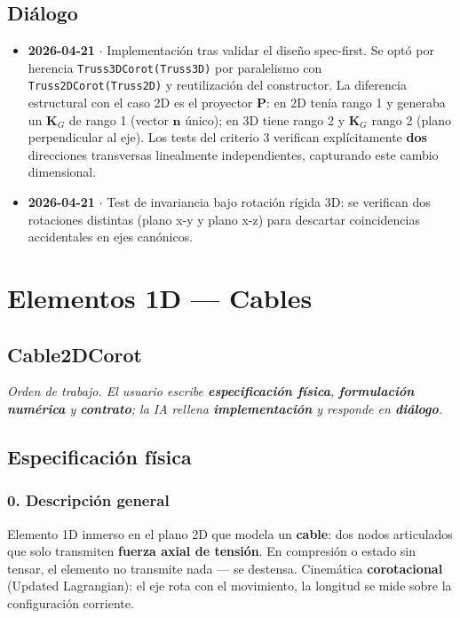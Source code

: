 \documentclass[11pt,letterpaper,oneside]{report}
\begin{document}
\section{Diálogo}

\begin{itemize}
  \item \textbf{2026-04-21} \ensuremath{\cdot} Implementación tras validar el diseño spec-first. Se optó por herencia \texttt{Truss3DCorot(Truss3D)} por paralelismo con \texttt{Truss2DCorot(Truss2D)} y reutilización del constructor. La diferencia estructural con el caso 2D es el proyector $\mathbf P$: en 2D tenía rango 1 y generaba un $\mathbf K_G$ de rango 1 (vector $\mathbf n$ único); en 3D tiene rango 2 y $\mathbf K_G$ rango 2 (plano perpendicular al eje). Los tests del criterio 3 verifican explícitamente \textbf{dos} direcciones transversas linealmente independientes, capturando este cambio dimensional.
  \item \textbf{2026-04-21} \ensuremath{\cdot} Test de invariancia bajo rotación rígida 3D: se verifican dos rotaciones distintas (plano x-y y plano x-z) para descartar coincidencias accidentales en ejes canónicos.
\end{itemize}


\newpage

\chapter{Elementos 1D — Cables}

\section{Cable2DCorot}



\textit{Orden de trabajo. El usuario escribe \textbf{especificación física}, \textbf{formulación numérica} y \textbf{contrato}; la IA rellena \textbf{implementación} y responde en \textbf{diálogo}.}



\section{Especificación física}

\subsection{0. Descripción general}
Elemento 1D inmerso en el plano 2D que modela un \textbf{cable}: dos nodos articulados que solo transmiten \textbf{fuerza axial de tensión}. En compresión o estado sin tensar, el elemento no transmite nada --- se destensa. Cinemática \textbf{corotacional} (Updated Lagrangian): el eje rota con el movimiento, la longitud se mide sobre la configuración corriente.
\end{document}
